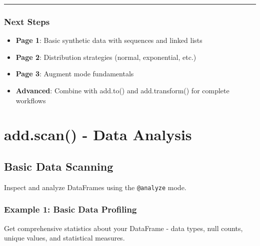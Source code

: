 \documentclass[
  letterpaper,
]{scrbook}
\providecommand{\tightlist}{%
  \setlength{\itemsep}{0pt}\setlength{\parskip}{0pt}}
\begin{document}
\begin{center}\rule{0.5\linewidth}{0.5pt}\end{center}

\section{Next Steps}\label{next-steps-15}

\begin{itemize}
\tightlist
\item
  \textbf{Page 1}: Basic synthetic data with sequences and linked lists
\item
  \textbf{Page 2}: Distribution strategies (normal, exponential, etc.)
\item
  \textbf{Page 3}: Augment mode fundamentals
\item
  \textbf{Advanced}: Combine with add.to() and add.transform() for
  complete workflows
\end{itemize}

\part{add.scan() - Data Analysis}

\chapter{Basic Data Scanning}\label{basic-data-scanning}

Inspect and analyze DataFrames using the \texttt{@analyze} mode.

\section{Example 1: Basic Data
Profiling}\label{example-1-basic-data-profiling}

Get comprehensive statistics about your DataFrame - data types, null
counts, unique values, and statistical measures.
\end{document}
